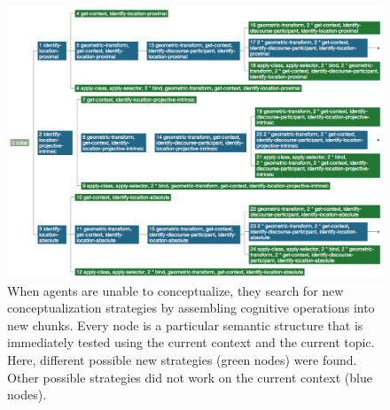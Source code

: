 \begin{figure}
\begin{center}
\includegraphics[width=1.0\columnwidth]{figs/conceptualization-strategy-invention-1.png}
\end{center}
\caption[Search for new conceptualization strategies]{
When agents are unable to conceptualize, they search for new 
conceptualization strategies by assembling cognitive operations 
into new chunks. Every node is a particular
semantic structure that is immediately tested using the current context and
the current topic. Here, different possible new strategies (green nodes) were found. 
Other possible strategies did not work on the current context (blue nodes).}
\label{f:strategy-invention-1}
\end{figure}

